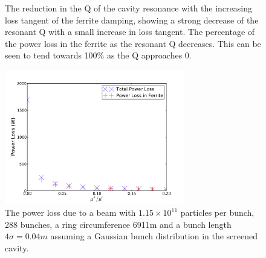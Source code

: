 \begin{figure}
\caption{ The reduction in the Q of the cavity resonance with the increasing loss tangent of the ferrite damping, showing a strong decrease of the resonant Q with a small increase in loss tangent.  The percentage of the power loss in the ferrite as the resonant Q decreases. This can be seen to tend towards 100\% as the Q approaches 0.}
\label{fig:screen_res_alterations}
\end{figure}

\begin{figure}
\begin{center}
\includegraphics[width=0.7\textwidth]{Beam_Coupling_Impedance_Reduction_Techniques/figures/screen_loss_tan_vs_power.pdf}
\end{center}
\caption{The power loss due to a beam with $1.15 \times 10^{11}$ particles per bunch, 288 bunches, a ring circumference 6911m and a bunch length $4\sigma = 0.04m$ assuming a Gaussian bunch distribution in the screened cavity.}
\label{fig:screen_loss_tan_v_power}
\end{figure}

